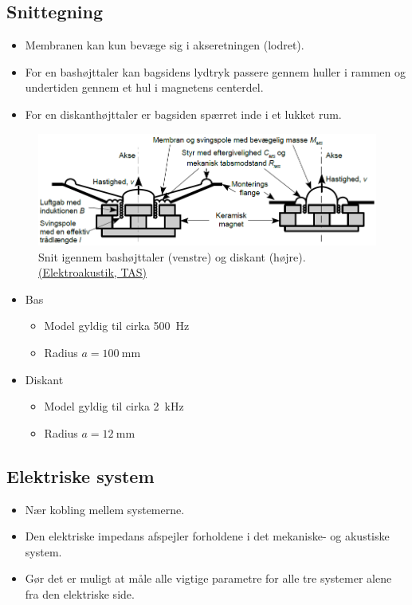 \subsection{Snittegning}
\begin{itemize}
	\item Membranen kan kun bevæge sig i akseretningen (lodret). \item For en bashøjttaler kan	bagsidens lydtryk passere gennem huller i rammen og undertiden gennem et hul i magnetens	centerdel.
	\item For en diskanthøjttaler er bagsiden  spærret inde i et lukket rum.
\end{itemize}

\begin{figure} [H]
	\centering
	\includegraphics[width=\linewidth]{graphics/22.png}
	\caption{Snit igennem bashøjttaler (venstre) og diskant (højre).\\ \href{http://www.torean.dk/artikel/Elektroakustik.pdf}{(Elektroakustik, TAS)}}
	\label{fig:22}
\end{figure}

\begin{itemize}
	\item Bas
	\begin{itemize}
		\item Model gyldig til cirka \SI{500}{\hertz}
		\item Radius $a = \SI{100}{\milli\meter}$
	\end{itemize}
	\item Diskant
	\begin{itemize}
		\item Model gyldig til cirka \SI{2}{\kilo\hertz}
		\item Radius $a = \SI{12}{\milli\meter}$
	\end{itemize}
\end{itemize}

\subsection{Elektriske system}
\begin{itemize}
	\item Nær kobling mellem systemerne.
	\item Den elektriske impedans afspejler forholdene i det mekaniske- og akustiske system.
	\item Gør det er muligt at måle alle vigtige parametre for alle tre systemer alene fra den elektriske side.
\end{itemize}

